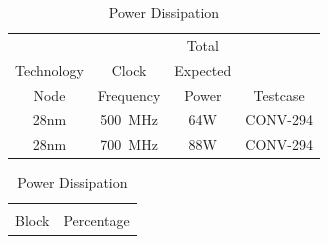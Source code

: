 \documentclass[journal]{IEEEtran}
\begin{document}
\begin{table}[h]
  \captionsetup{justification=centering, skip=3pt}
  \caption{Power Estimates}
  \vspace{3pt}
  \label{tab:Simulation-based estimates}
  \centering
  \begin{subtable}{0.5\textwidth}
    \centering
    \begin{adjustbox}{width=0.85\textwidth}
      \begin{tabular}{cccc}
        \toprule
                         &                       & Total    &                                          \\  %
            Technology   & Clock                 & Expected &                                          \\  %
                Node     & Frequency             &  Power   &  Testcase                                \\  %
        \hline  %
                   28nm  & \SI{500}{\mega\hertz} &   64W    &  CONV-294\\ %
                   28nm  & \SI{700}{\mega\hertz} &   88W    &  CONV-294\\ %
        \bottomrule
      \end{tabular}
    \end{adjustbox}
    \vspace{3pt}
    \captionsetup{justification=centering, skip=10pt}
    \caption{Power Dissipation}
    \label{tab:Power Dissipation}
  \end{subtable}
  \bigskip
  \begin{subtable}{0.5\textwidth}
    \centering
    \begin{adjustbox}{width=0.55\textwidth}
      \begin{tabular}{cc}
        \toprule
                         &                                          \\  %
            Block        & Percentage                               \\  %

\end{tabular}
\end{adjustbox}
\end{subtable}
\end{table}
\end{document}
